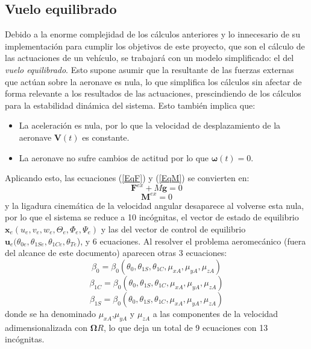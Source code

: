 \subsection{Vuelo equilibrado}

Debido a la enorme complejidad de los cálculos anteriores y lo innecesario de su implementación para cumplir los objetivos de este proyecto, que son el cálculo de las actuaciones de un vehículo, se trabajará con un modelo simplificado: el del \emph{vuelo equilibrado}. Esto supone asumir que la resultante de las fuerzas externas que actúan sobre la aeronave es nula, lo que simplifica los cálculos sin afectar de forma relevante a los resultados de las actuaciones, prescindiendo de los cálculos para la estabilidad dinámica del sistema.
Esto también implica que:
\begin{itemize}
	\item La aceleración es nula, por lo que la velocidad de desplazamiento de la aeronave $\mathrm{\textbf{V}}(t)$ es constante.
	\item La aeronave no sufre cambios de actitud por lo que $\boldsymbol{\omega}(t)=0$.
\end{itemize}

Aplicando esto, las ecuaciones (\ref{EqF}) y (\ref{EqM}) se convierten en:
\begin{equation}
	\mathrm{\textbf{F}}^{ex}+M\mathrm{\textbf{g}}=0
	\label{EqFe}
\end{equation}
\begin{equation}
	\mathrm{\textbf{M}}^{ex}=0
	\label{EqMe}
\end{equation}
y la ligadura cinemática de la velocidad angular desaparece al volverse esta nula, por lo que el sistema se reduce a 10 incógnitas, el vector de estado de equilibrio $\mathrm{\textbf{x}}_e(u_e, v_e, w_e, \Theta_e, \Phi_e, \Psi_e)$ y las del vector de control de equilibrio $\mathrm{\textbf{u}}_e(\theta_{0e}, \theta_{1Se}, \theta_{1Ce}, \theta_{Te}$), y 6 ecuaciones.
Al resolver el problema aeromecánico (fuera del alcance de este documento) aparecen otras 3 ecuaciones:
\begin{equation}
\beta_0=\beta_0(\theta_0,\theta_{1S},\theta_{1C},\mu_{xA},\mu_{yA},\mu_{zA})
\label{beta0}
\end{equation}
\begin{equation}
\beta_{1C}=\beta_0(\theta_0,\theta_{1S},\theta_{1C},\mu_{xA},\mu_{yA},\mu_{zA})
\label{beta1c}
\end{equation}
\begin{equation}
\beta_{1S}=\beta_0(\theta_0,\theta_{1S},\theta_{1C},\mu_{xA},\mu_{yA},\mu_{zA})
\label{beta1s}
\end{equation}
donde se ha denominado $\mu_{xA}$,$\mu_{yA}$ y $\mu_{zA}$ a las componentes de la velocidad adimensionalizada con $\boldsymbol{\Omega}R$, lo que deja un total de 9 ecuaciones con 13 incógnitas.


